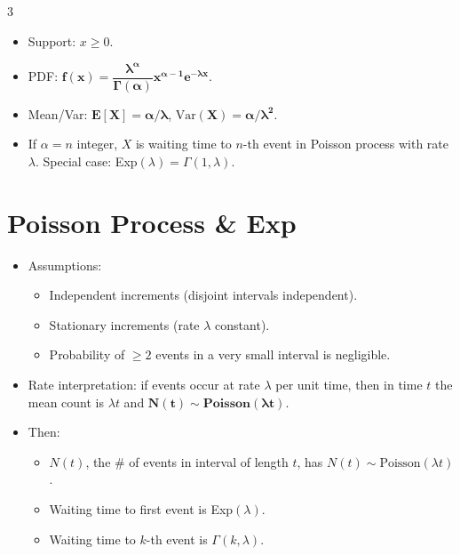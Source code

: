 \documentclass[11pt,landscape]{article}
\begin{document}
\begin{multicols}{3}
\begin{itemize}
    \begin{itemize}
      \item Support: $x\ge0$.
      \item PDF: $\mathbf{f(x)=\dfrac{\lambda^{\alpha}}{\Gamma(\alpha)}x^{\alpha-1}e^{-\lambda x}}$.
      \item Mean/Var: $\mathbf{E[X]=\alpha/\lambda}$, $\mathbf{\mathrm{Var}(X)=\alpha/\lambda^2}$.
      \item If $\alpha=n$ integer, $X$ is waiting time to $n$-th event in Poisson process with rate $\lambda$. Special case: Exp$(\lambda)=\Gamma(1,\lambda)$.
    \end{itemize}
\end{itemize}

\section{Poisson Process \& Exp}
\begin{itemize}
  \item Assumptions:
    \begin{itemize}
      \item Independent increments (disjoint intervals independent).
      \item Stationary increments (rate $\lambda$ constant).
      \item Probability of $\ge2$ events in a very small interval is negligible.
    \end{itemize}
  \item Rate interpretation: if events occur at rate $\lambda$ per unit time, then in time $t$ the mean count is $\lambda t$ and $\mathbf{N(t)\sim\text{Poisson}(\lambda t)}$.
  \item Then:
    \begin{itemize}
      \item $N(t)$, the \# of events in interval of length $t$, has $N(t)\sim\text{Poisson}(\lambda t)$.
      \item Waiting time to first event is Exp$(\lambda)$.
      \item Waiting time to $k$-th event is $\Gamma(k,\lambda)$.
    \end{itemize}
\end{itemize}


\end{multicols}
\end{document}
